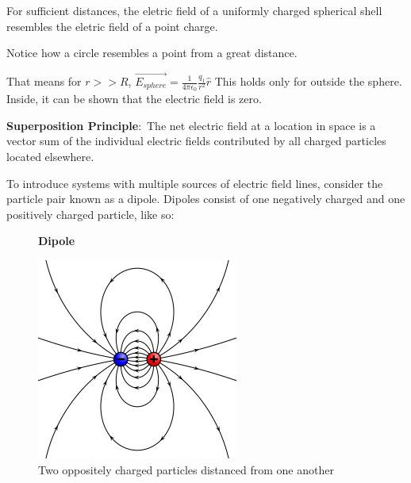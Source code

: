 \documentclass[nobib]{tufte-handout}
\newcommand{\defn}[2]{\textbf{#1}:\ #2}
\begin{document}
For sufficient distances, the eletric field
of a uniformly charged spherical shell resembles
the eletric field of a point charge. 

\begin{marginfigure}
    \begin{center}
    \end{center}

    \caption{Notice how a circle resembles a point from a great distance.}
    \label{fig:long-distance-point-sphere}
\end{marginfigure}

That means for $r>>R$, $\vec{E_{sphere}} = \frac{1}{4\pi \epsilon_0}\frac{q_1}{r^2}\hat{r}$
This holds only for outside the sphere. Inside, it can be shown that the electric field is zero. 

\defn{Superposition Principle}{The net electric field at a location in space is a
vector sum of the individual electric fields contributed by all
charged particles located elsewhere.}

To introduce systems with multiple sources of electric field lines, consider
the particle pair known as a dipole. Dipoles consist of one negatively charged
and one positively charged particle, like so:
\begin{figure}
    \centering
    \textbf{Dipole}\par\medskip
    \includegraphics[width=\textwidth / 2]{VFPt_dipole_electric.svg.png}
    \caption{Two oppositely charged particles distanced from one another}
\end{figure}
\end{document}

